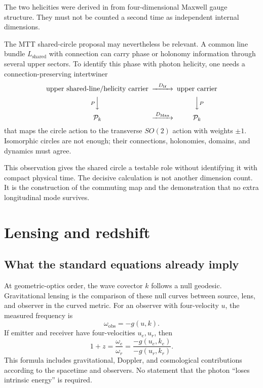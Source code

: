 \documentclass[11pt,a4paper]{article}
\numberwithin{equation}{section}
\theoremstyle{definition}
\theoremstyle{remark}
\newcommand{\cP}{\mathcal P}
\newcommand{\cU}{\mathcal U}
\begin{document}
The two helicities were derived in
 from four-dimensional Maxwell gauge
structure.  They must not be counted a second time as independent
internal dimensions.

The MTT shared-circle proposal may nevertheless be relevant.  A common
line bundle \(L_{\mathrm{shared}}\) with connection can carry phase or
holonomy information through several upper sectors.  To identify this
phase with photon helicity, one needs a connection-preserving
intertwiner
\[
\begin{CD}
\text{upper shared-line/helicity carrier}
@>{D_{\cU}}>>
\text{upper carrier}\\
@V{P}VV @VV{P}V\\
\cP_k @>{D_{\mathrm{Max}}}>>
\cP_k
\end{CD}
\]
that maps the circle action to the transverse \(SO(2)\) action with
weights \(\pm1\).  Isomorphic circles are not enough; their connections,
holonomies, domains, and dynamics must agree.

This observation gives the shared circle a testable role without
identifying it with compact physical time.  The decisive calculation is
not another dimension count.  It is the construction of the commuting
map and the demonstration that no extra longitudinal mode survives.

\section{Lensing and redshift}

\subsection{What the standard equations already imply}

At geometric-optics order, the wave covector \(k\) follows a null
geodesic.  Gravitational lensing is the comparison of these null curves
between source, lens, and observer in the curved metric.  For an observer
with four-velocity \(u\), the measured frequency is
\begin{equation}
\omega_{\mathrm{obs}}=-g(u,k).
\label{eq:frequency}
\end{equation}
If emitter and receiver have four-velocities \(u_e,u_r\), then
\[
1+z=\frac{\omega_e}{\omega_r}
=\frac{-g(u_e,k_e)}{-g(u_r,k_r)}.
\]
This formula includes gravitational, Doppler, and cosmological
contributions according to the spacetime and observers.  No statement
that the photon ``loses intrinsic energy'' is required.
\end{document}
